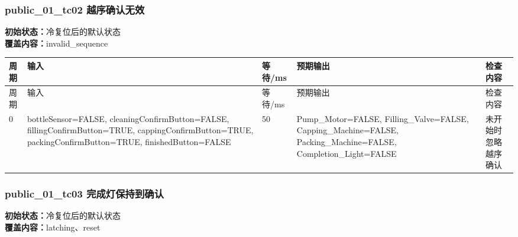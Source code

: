 \subsubsection{{\ttfamily public\_01\_tc02} 越序确认无效}

\noindent\textbf{初始状态：}冷复位后的默认状态\\

\textbf{覆盖内容：}invalid\_sequence

\begin{longtable}{L{1.0cm}L{4.7cm}L{1.4cm}L{4.0cm}L{2.1cm}}

\toprule

周期 & 输入 & 等待/ms & 预期输出 & 检查内容\\

\midrule

\endfirsthead

\toprule

周期 & 输入 & 等待/ms & 预期输出 & 检查内容\\

\midrule

\endhead

0 & bottleSensor=FALSE, cleaningConfirmButton=FALSE, fillingConfirmButton=TRUE, cappingConfirmButton=TRUE, packingConfirmButton=TRUE, finishedButton=FALSE & 50 & Pump\_Motor=FALSE, Filling\_Valve=FALSE, Capping\_Machine=FALSE, Packing\_Machine=FALSE, Completion\_Light=FALSE & 未开始时忽略越序确认\\

\bottomrule

\end{longtable}

\subsubsection{{\ttfamily public\_01\_tc03} 完成灯保持到确认}

\noindent\textbf{初始状态：}冷复位后的默认状态\\

\textbf{覆盖内容：}latching、reset

